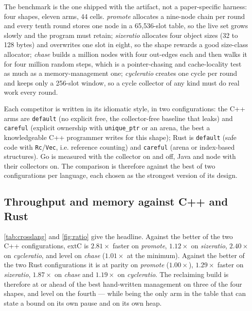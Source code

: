 The benchmark is the one shipped with the artifact, not a paper-specific harness: four shapes,
eleven arms, 44 cells.  \emph{promote} allocates a nine-node chain per round and every tenth
round stores one node in a 65{,}536-slot table, so the live set grows slowly and the program
must retain; \emph{sizeratio} allocates four object sizes (32 to 128 bytes) and overwrites one
slot in eight, so the shape rewards a good size-class allocator; \emph{chase} builds a million
nodes with four out-edges each and then walks it for four million random steps, which is a
pointer-chasing and cache-locality test as much as a memory-management one; \emph{cycleratio}
creates one cycle per round and keeps only a 256-slot window, so a cycle collector of any kind
must do real work every round.

Each competitor is written in its idiomatic style, in two configurations: the C++ arms are
\texttt{default} (no explicit free, the collector-free baseline that leaks) and \texttt{careful}
(explicit ownership with \texttt{unique\_ptr} or an arena, the best a knowledgeable C++
programmer writes for this shape); Rust is \texttt{default} (safe code with
\texttt{Rc}/\texttt{Vec}, i.e. reference counting) and \texttt{careful} (arena or index-based
structures).  Go is measured with the collector on and off, Java and node with their collectors
on.  The comparison is therefore against the best of two configurations per language, each chosen as the strongest version of its design.

\subsection{Throughput and memory against C++ and Rust}
\label{sec:eval-crosslang}



\tab\ref{tab:crosslang} and \fig\ref{fig:ratio} give the headline.  Against the better of the two
C++ configurations, extC is $2.81\times$ faster on \emph{promote}, $1.12\times$ on
\emph{sizeratio}, $2.40\times$ on \emph{cycleratio}, and level on \emph{chase} ($1.01\times$ at the
minimum).  Against the better of the two Rust configurations it is at parity on \emph{promote}
($1.00\times$), $1.29\times$ faster on \emph{sizeratio}, $1.87\times$ on \emph{chase} and
$1.19\times$ on \emph{cycleratio}.  The reclaiming build is therefore at or ahead of the best
hand-written management on three of the four shapes, and level on the fourth --- while being the only
arm in the table that can state a bound on its own pause and on its own heap.

